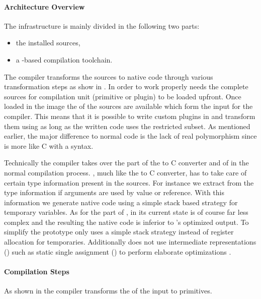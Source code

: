 \paragraph{Architecture Overview}
The \WF infrastructure is mainly divided in the following two parts: 
\begin{itemize}[nolistsep,noitemsep]
	\item the installed \Slang sources,
	\item a \B-based compilation toolchain.
\end{itemize}
The \WF compiler transforms the \Slang sources to native code through various transformation steps as show in .
In order to work properly \WF needs the complete \Slang sources for compilation unit (primitive or plugin) to be loaded upfront.
Once loaded in the \PH image the \AST of the \Slang sources are available which form the input for the \WF compiler.
This means that it is possible to write custom plugins in \PH and transform them using \WF as long as the written \PH code uses the restricted \Slang subset.
As mentioned earlier, the major difference to normal \PH code is the lack of real polymorphism since \Slang is more like C with a \ST syntax.

Technically the \WF compiler takes over the part of the \Slang to C converter and of \GCC in the normal \VM compilation process.
\WF, much like the \Slang to C converter, has to take care of certain type information present in the \Slang sources.
For instance we extract from the type information if arguments are used by value or reference.
With this information we generate native code using a simple stack based strategy for temporary variables.
As for the part of \GCC, \WF in its current state is of course far less complex and the resulting the native code is inferior to \GCC's optimized output.
To simplify the prototype \WF only uses a simple stack strategy instead of register allocation for temporaries.
Additionally \WF does not use intermediate representations (\IR) such as static single assignment (\SSA) to perform elaborate optimizations \cite[Ch.\ 1]{Appe98a}.


\paragraph{Compilation Steps}
As shown in  the \WF compiler transforms the \AST of the \Slang input to \PH primitives.


